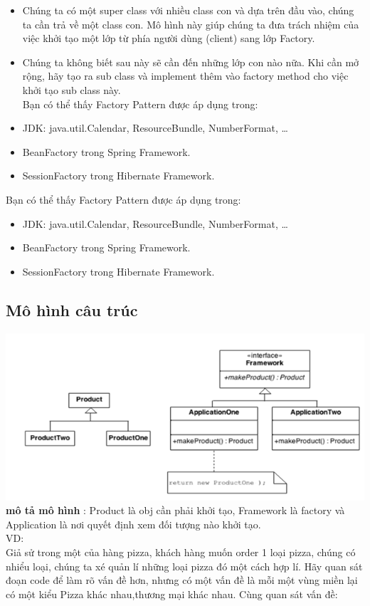 \begin{itemize}
	\item Chúng ta có một super class với nhiều class con và dựa trên đầu vào, chúng ta cần trả về một class con. Mô hình này giúp chúng ta đưa trách nhiệm của việc khởi tạo một lớp từ phía người dùng (client) sang lớp Factory.
	\item Chúng ta không biết sau này sẽ cần đến những lớp con nào nữa. Khi cần mở rộng, hãy tạo ra sub class và implement thêm vào factory method cho việc khởi tạo sub class này.\\
Bạn có thể thấy Factory Pattern được áp dụng trong:
\item JDK: java.util.Calendar, ResourceBundle, NumberFormat, …
\item BeanFactory trong Spring Framework.
\item SessionFactory trong Hibernate Framework.
\end{itemize}
Bạn có thể thấy Factory Pattern được áp dụng trong:
\begin{itemize}
	\item JDK: java.util.Calendar, ResourceBundle, NumberFormat, …
	\item BeanFactory trong Spring Framework.
	\item SessionFactory trong Hibernate Framework.
\end{itemize}
\subsection{Mô hình câu trúc}
\includegraphics{GALLEYS/images/chapter5/diagram1}\\
\textbf{mô tả mô hình} : Product là obj cần phải khởi tạo, Framework là factory và Application là nơi quyết định xem đối tượng nào khởi tạo.\\
VD:\\
Giả sử trong một của hàng pizza, khách hàng muốn order 1 loại pizza, chúng có nhiểu loại, chúng ta xé quản lí những loại pizza đó một cách hợp lí. Hãy quan sát đoạn code để làm rõ vấn đề hơn, nhưng có một vấn đề là mỗi một vùng miền lại có một kiểu Pizza khác nhau,thương mại khác nhau. Cùng quan sát vấn đề:\\

